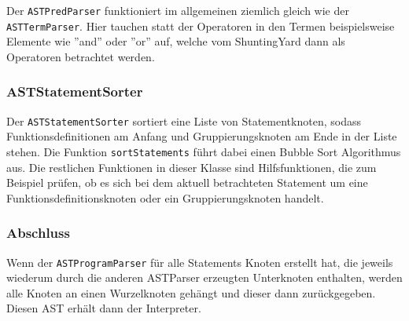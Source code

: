 Der \texttt{ASTPredParser} funktioniert im allgemeinen ziemlich gleich wie der \texttt{ASTTermParser}. Hier tauchen statt der Operatoren in den Termen beispielsweise Elemente wie ''and'' oder ''or'' auf, welche vom ShuntingYard dann als Operatoren betrachtet werden.

\subsubsection{ASTStatementSorter}

Der \texttt{ASTStatementSorter} sortiert eine Liste von Statementknoten, sodass Funktionsdefinitionen am Anfang und Gruppierungsknoten am Ende in der Liste stehen. Die Funktion \texttt{sortStatements} führt dabei einen Bubble Sort Algorithmus aus. Die restlichen Funktionen in dieser Klasse sind Hilfsfunktionen, die zum Beispiel prüfen, ob es sich bei dem aktuell betrachteten Statement um eine Funktionsdefinitionsknoten oder ein Gruppierungsknoten handelt.

\subsubsection{Abschluss}

Wenn der \texttt{ASTProgramParser} für alle Statements Knoten erstellt hat, die jeweils wiederum durch die anderen ASTParser erzeugten Unterknoten enthalten, werden alle Knoten an einen Wurzelknoten gehängt und dieser dann zurückgegeben. Diesen AST erhält dann der Interpreter.

